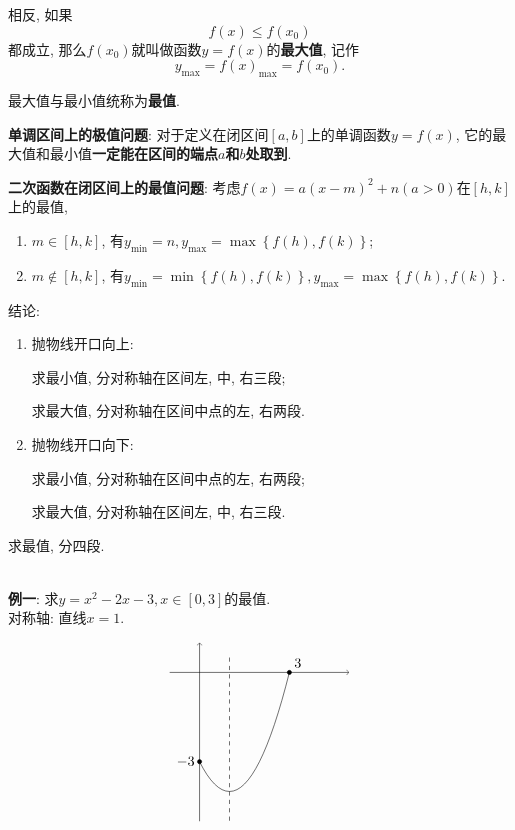 \documentclass[8pt]{article}
\begin{document}
				相反, 如果$$f(x)\leq f(x_0)$$都成立, 那么$f(x_0)$就叫做函数$y=f(x)$的\textbf{最大值}, 记作$$y_{\max}=f(x)_{\max}=f(x_0).$$

				最大值与最小值统称为\textbf{最值}.

				\textbf{单调区间上的极值问题}: 对于定义在闭区间$[a, b]$上的单调函数$y=f(x)$, 它的最大值和最小值\textbf{一定能在区间的端点$a$和$b$处取到}.

				\textbf{二次函数在闭区间上的最值问题}: 考虑$f(x)=a(x-m)^2+n (a>0)$在$[h, k]$上的最值,

				\begin{enumerate}[label=$\arabic*^{\circ}$]
					\item $m\in[h,k]$, 有$y_{\min}=n, y_{\max}=\max\left\{f(h), f(k)\right\}$;
					\item $m\notin[h,k]$, 有$y_{\min}=\min\left\{f(h), f(k)\right\}, y_{\max}=\max\left\{f(h), f(k)\right\}$.
				\end{enumerate}

				结论:

				\begin{enumerate}[label=$\arabic*^{\circ}$]
					\item 抛物线开口向上:

						求最小值, 分对称轴在区间左, 中, 右三段;

						求最大值, 分对称轴在区间中点的左, 右两段.

					\item 抛物线开口向下:

						求最小值, 分对称轴在区间中点的左, 右两段;

						求最大值, 分对称轴在区间左, 中, 右三段.
				\end{enumerate}

				求最值, 分四段.

				~\\

				\textbf{例一}: 求$y=x^2-2x-3, x\in[0, 3]$的最值.
					~\\

					对称轴: 直线$x=1$.

					$$
					\begin{tikzpicture}[scale=0.75]
			    		\draw[black, ->] (-1,  0)--( 5,  0);
			    		\draw[black, ->] ( 0, -5)--( 0,  1);
			    		\draw[black, domain=0:3] plot(\x, \x * \x - 2 * \x - 3);
			    		\draw[black, dashed] ( 1, 0.5)--( 1, -5);
						\filldraw[black] (3, 0) circle (2pt) node[anchor=south west] {$3$};
						\filldraw[black] (0, -3) circle (2pt) node[anchor=east] {$-3$};
			    	\end{tikzpicture}$$
\end{document}
